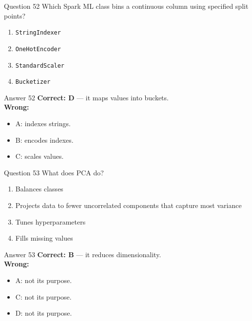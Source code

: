 \documentclass[aspectratio=169,11pt]{beamer}
\begin{document}
\begin{frame}{Question 52}
Which Spark ML class bins a continuous column using specified split points?
\begin{enumerate}[label=\Alph*.]
\item \texttt{StringIndexer}
\item \texttt{OneHotEncoder}
\item \texttt{StandardScaler}
\item \texttt{Bucketizer}
\end{enumerate}
\end{frame}
\begin{frame}{Answer 52}
\textbf{Correct: D} --- it maps values into buckets.\\
\vspace{0.5em}
\textbf{Wrong:}
\begin{itemize}
\item A: indexes strings.
\item B: encodes indexes.
\item C: scales values.
\end{itemize}
\end{frame}

\begin{frame}{Question 53}
What does PCA do?
\begin{enumerate}[label=\Alph*.]
\item Balances classes
\item Projects data to fewer uncorrelated components that capture most variance
\item Tunes hyperparameters
\item Fills missing values
\end{enumerate}
\end{frame}
\begin{frame}{Answer 53}
\textbf{Correct: B} --- it reduces dimensionality.\\
\vspace{0.5em}
\textbf{Wrong:}
\begin{itemize}
\item A: not its purpose.
\item C: not its purpose.
\item D: not its purpose.
\end{itemize}
\end{frame}
\end{document}
